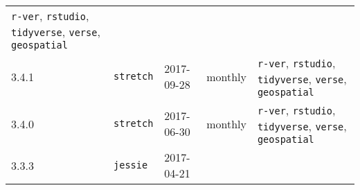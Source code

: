 \begin{longtable}[]{@{}lllll@{}}
\begin{minipage}[t]{0.32\columnwidth}
\texttt{r-ver}, \texttt{rstudio}, \texttt{tidyverse}, \texttt{verse},
\texttt{geospatial}\strut
\end{minipage}\tabularnewline
\begin{minipage}[t]{0.09\columnwidth}\raggedright\strut
3.4.1\strut
\end{minipage} & \begin{minipage}[t]{0.12\columnwidth}\raggedright\strut
\texttt{stretch}\strut
\end{minipage} & \begin{minipage}[t]{0.15\columnwidth}\raggedright\strut
2017-09-28\strut
\end{minipage} & \begin{minipage}[t]{0.19\columnwidth}\raggedright\strut
monthly\strut
\end{minipage} & \begin{minipage}[t]{0.32\columnwidth}\raggedright\strut
\texttt{r-ver}, \texttt{rstudio}, \texttt{tidyverse}, \texttt{verse},
\texttt{geospatial}\strut
\end{minipage}\tabularnewline
\begin{minipage}[t]{0.09\columnwidth}\raggedright\strut
3.4.0\strut
\end{minipage} & \begin{minipage}[t]{0.12\columnwidth}\raggedright\strut
\texttt{stretch}\strut
\end{minipage} & \begin{minipage}[t]{0.15\columnwidth}\raggedright\strut
2017-06-30\strut
\end{minipage} & \begin{minipage}[t]{0.19\columnwidth}\raggedright\strut
monthly\strut
\end{minipage} & \begin{minipage}[t]{0.32\columnwidth}\raggedright\strut
\texttt{r-ver}, \texttt{rstudio}, \texttt{tidyverse}, \texttt{verse},
\texttt{geospatial}\strut
\end{minipage}\tabularnewline
\begin{minipage}[t]{0.09\columnwidth}\raggedright\strut
3.3.3\strut
\end{minipage} & \begin{minipage}[t]{0.12\columnwidth}\raggedright\strut
\texttt{jessie}\strut
\end{minipage} & \begin{minipage}[t]{0.15\columnwidth}\raggedright\strut
2017-04-21\strut
\end{minipage} & \begin{minipage}[t]{0.19\columnwidth}\raggedright\strut

\end{minipage}
\end{longtable}
